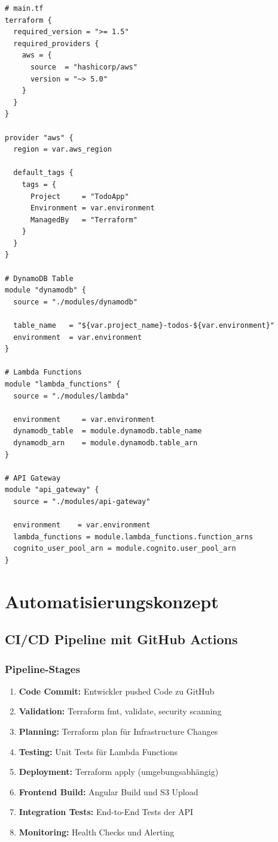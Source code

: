 \begin{lstlisting}[style=terraform, caption=Hauptkonfiguration (main.tf)]
# main.tf
terraform {
  required_version = ">= 1.5"
  required_providers {
    aws = {
      source  = "hashicorp/aws"
      version = "~> 5.0"
    }
  }
}

provider "aws" {
  region = var.aws_region
  
  default_tags {
    tags = {
      Project     = "TodoApp"
      Environment = var.environment
      ManagedBy   = "Terraform"
    }
  }
}

# DynamoDB Table
module "dynamodb" {
  source = "./modules/dynamodb"
  
  table_name   = "${var.project_name}-todos-${var.environment}"
  environment  = var.environment
}

# Lambda Functions
module "lambda_functions" {
  source = "./modules/lambda"
  
  environment     = var.environment
  dynamodb_table  = module.dynamodb.table_name
  dynamodb_arn    = module.dynamodb.table_arn
}

# API Gateway
module "api_gateway" {
  source = "./modules/api-gateway"
  
  environment    = var.environment
  lambda_functions = module.lambda_functions.function_arns
  cognito_user_pool_arn = module.cognito.user_pool_arn
}
\end{lstlisting}

\section{Automatisierungskonzept}

\subsection{CI/CD Pipeline mit GitHub Actions}

\subsubsection{Pipeline-Stages}

\begin{enumerate}
    \item \textbf{Code Commit:} Entwickler pushed Code zu GitHub
    \item \textbf{Validation:} Terraform fmt, validate, security scanning
    \item \textbf{Planning:} Terraform plan für Infrastructure Changes
    \item \textbf{Testing:} Unit Tests für Lambda Functions
    \item \textbf{Deployment:} Terraform apply (umgebungsabhängig)
    \item \textbf{Frontend Build:} Angular Build und S3 Upload
    \item \textbf{Integration Tests:} End-to-End Tests der API
    \item \textbf{Monitoring:} Health Checks und Alerting
\end{enumerate}


